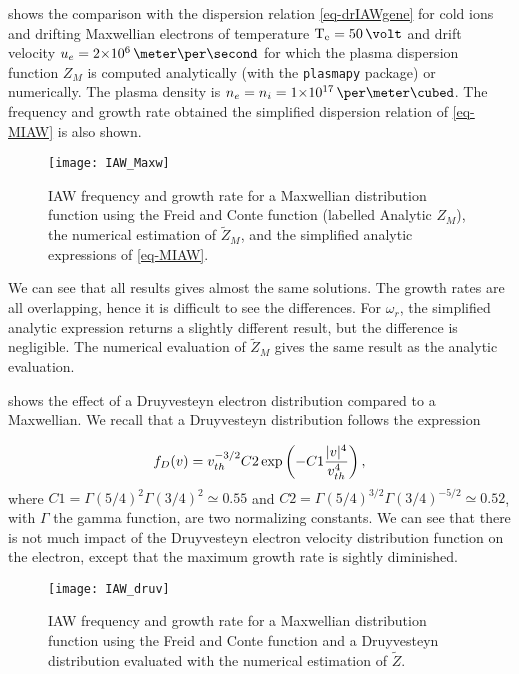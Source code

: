    shows the comparison with the dispersion relation \cref{eq-drIAWgene} for cold ions and drifting Maxwellian electrons of temperature $\Te=50\,\volt$ and drift velocity $u_e = \sn{2}{6} \,\meter\per\second$ for which the plasma dispersion function $Z_M$ is computed analytically (with the \texttt{plasmapy} package) or numerically.
  The plasma density is $n_e = n_i = \sn{1}{17} \,\per\meter\cubed$.
  The frequency and growth rate obtained the simplified dispersion relation of \cref{eq-MIAW} is also shown. 
  
  \begin{figure}[hbt]
    \centering
    \texttt{[image: IAW\_Maxw]}
    \caption{IAW frequency and growth rate for a Maxwellian distribution function using the Freid and Conte function (labelled Analytic $Z_M$), the numerical estimation of $\tilde{Z}_M$, and the simplified analytic expressions of \cref{eq-MIAW}. }
    \label{fig-IAW_Maxw}
  \end{figure}
  
  We can see that all results gives almost the same solutions.
  The growth rates are all overlapping, hence it is difficult to see the differences.
  For $\omega_r$, the simplified analytic expression returns a slightly different result, but the difference is negligible.
  The numerical evaluation of $\tilde{Z}_M$ gives the same result as the analytic evaluation.
  
   shows the effect of a Druyvesteyn electron distribution compared to a Maxwellian.
  We recall that a Druyvesteyn distribution follows the expression

  \begin{equation} \label{eq-druyv}
    f_{D}(v) = v_{th}^{-3/2} C2 \exp \left( -C1 \frac{\lvert v\rvert^4}{v_{th}^4}  \right) ,
  \end{equation}
  where $C1 = \Gamma(5/4)^2\Gamma(3/4)^2 \simeq 0.55$ and $C2 = \Gamma(5/4)^{3/2}\Gamma(3/4)^{-5/2} \simeq 0.52$, with $\Gamma$ the gamma function, are two normalizing constants.
  We can see that there is not much impact of the Druyvesteyn electron velocity distribution function on the electron, except that the maximum growth rate is sightly diminished.
  
  \begin{figure}[!hbt]
    \centering
    \texttt{[image: IAW\_druv]}
    \caption{IAW frequency and growth rate for a Maxwellian distribution function using the Freid and Conte function and a Druyvesteyn distribution evaluated with the numerical estimation of $\tilde{Z}$. }
    \label{fig-IAW_druv}
  \end{figure}
  

